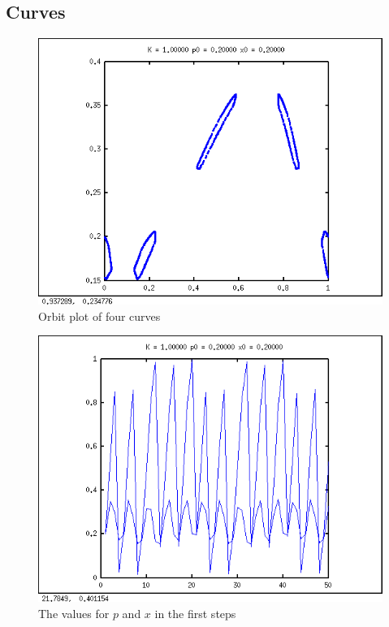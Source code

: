 \documentclass{article}
\begin{document}
\subsection*{Curves}
\begin{figure}[h!]
\centering
\includegraphics[width=\textwidth]{curvesorbit.png}
\caption{Orbit plot of four curves}
\label{curveorbit}
\end{figure}
\begin{figure}[h!]
\centering
\includegraphics[width=\textwidth]{curvesvalues.png}
\caption{The values for $p$ and $x$ in the first steps }
\label{curveval}
\end{figure}
\end{document}
